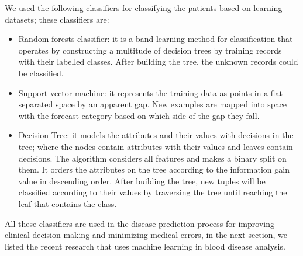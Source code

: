 \documentclass[twocolumn]{article}
\begin{document}
We used the following classifiers for classifying the patients based on learning datasets; these classifiers are:
\begin{itemize}

\item Random forests classifier: it is a band learning method for classification that operates by constructing a multitude of decision trees by training records with their labelled classes. After building the tree, the unknown records could be classified.

\item Support vector machine: it represents the training data as points in a flat separated space by an apparent gap. New examples are mapped into space with the forecast category based on which side of the gap they fall. 

\item Decision Tree: it models the attributes and their values with decisions in the tree; where the nodes contain attributes with their values and leaves contain decisions. The algorithm considers all features and makes a binary split on them. It orders the attributes on the tree according to the information gain value in descending order. After building the tree, new tuples will be classified according to their values by traversing the tree until reaching the leaf that contains the class.
\end{itemize}
All these classifiers are used in the disease prediction process for improving clinical decision-making and minimizing medical errors, in the next section, we listed the recent research that uses machine learning in blood disease analysis.
\end{document}
